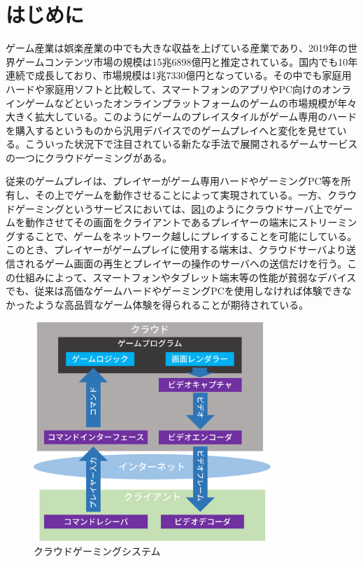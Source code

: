 \section{はじめに}
ゲーム産業は娯楽産業の中でも大きな収益を上げている産業であり、2019年の世界ゲームコンテンツ市場の規模は15兆6898億円と推定されている\cite{prtimes}。国内でも10年連続で成長しており、市場規模は1兆7330億円となっている。その中でも家庭用ハードや家庭用ソフトと比較して、スマートフォンのアプリやPC向けのオンラインゲームなどといったオンラインプラットフォームのゲームの市場規模が年々大きく拡大している。このようにゲームのプレイスタイルがゲーム専用のハードを購入するというものから汎用デバイスでのゲームプレイへと変化を見せている。こういった状況下で注目されている新たな手法で展開されるゲームサービスの一つにクラウドゲーミングがある。

従来のゲームプレイは、プレイヤーがゲーム専用ハードやゲーミングPC等を所有し、その上でゲームを動作させることによって実現されている。一方、クラウドゲーミングというサービスにおいては、図\ref{fig:cloudgaming}のようにクラウドサーバ上でゲームを動作させてその画面をクライアントであるプレイヤーの端末にストリーミングすることで、ゲームをネットワーク越しにプレイすることを可能にしている。このとき、プレイヤーがゲームプレイに使用する端末は、クラウドサーバより送信されるゲーム画面の再生とプレイヤーの操作のサーバへの送信だけを行う。この仕組みによって、スマートフォンやタブレット端末等の性能が貧弱なデバイスでも、従来は高価なゲームハードやゲーミングPCを使用しなければ体験できなかったような高品質なゲーム体験を得られることが期待されている。

\begin{figure}[t]
    \centering
    \includegraphics[width=0.8\textwidth,keepaspectratio,clip]{img/cloudgaming.eps}
    \caption{クラウドゲーミングシステム}
    \label{fig:cloudgaming}
\end{figure}

